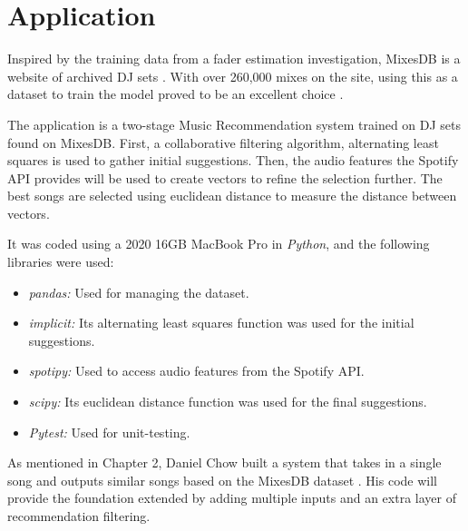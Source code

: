 
\graphicspath{{Chapter5/}}



\chapter{Application}

Inspired by the training data from a fader estimation investigation, MixesDB is a website of archived DJ sets \citep{kim_automatic_2017}. With over 260,000 mixes on the site, using this as a dataset to train the model proved to be an excellent choice \citep{mixesdb_main_2023}.

The application is a two-stage Music Recommendation system trained on DJ sets found on MixesDB. First, a collaborative filtering algorithm, alternating least squares is used to gather initial suggestions. Then, the audio features the Spotify API provides will be used to create vectors to refine the selection further. The best songs are selected using euclidean distance to measure the distance between vectors. 

It was coded using a 2020 16GB MacBook Pro in \textit{Python}, and the following libraries were used:
\begin{itemize}
	\item \textit{pandas:} Used for managing the dataset.
	\item \textit{implicit:} Its alternating least squares function was used for the initial suggestions.
	\item \textit{spotipy:} Used to access audio features from the Spotify API.
	\item \textit{scipy:} Its euclidean distance function was used for the final suggestions.
	\item \textit{Pytest:} Used for unit-testing.
\end{itemize}

As mentioned in Chapter 2, Daniel Chow built a system that takes in a single song and outputs similar songs based on the MixesDB dataset \citep{chow_music_2020}. His code will provide the foundation extended by adding multiple inputs and an extra layer of recommendation filtering.


